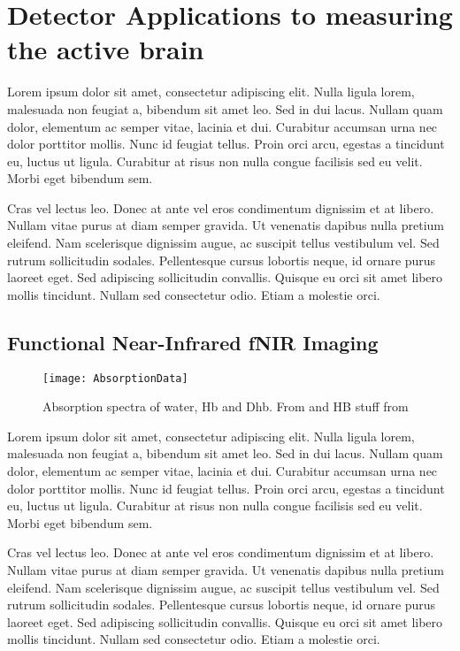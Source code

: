 \chapter{Detector Applications to measuring the active brain}
Lorem ipsum dolor sit amet, consectetur adipiscing elit. Nulla ligula lorem, malesuada non feugiat a, bibendum sit amet leo. Sed in dui lacus. Nullam quam dolor, elementum ac semper vitae, lacinia et dui. Curabitur accumsan urna nec dolor porttitor mollis. Nunc id feugiat tellus. Proin orci arcu, egestas a tincidunt eu, luctus ut ligula. Curabitur at risus non nulla congue facilisis sed eu velit. Morbi eget bibendum sem.

Cras vel lectus leo. Donec at ante vel eros condimentum dignissim et at libero. Nullam vitae purus at diam semper gravida. Ut venenatis dapibus nulla pretium eleifend. Nam scelerisque dignissim augue, ac suscipit tellus vestibulum vel. Sed rutrum sollicitudin sodales. Pellentesque cursus lobortis neque, id ornare purus laoreet eget. Sed adipiscing sollicitudin convallis. Quisque eu orci sit amet libero mollis tincidunt. Nullam sed consectetur odio. Etiam a molestie orci.

\section{{F}unctional {N}ear-{I}nfrared {fNIR} Imaging}
\begin{figure}[b]
  \begin{center}
    \texttt{[image: AbsorptionData]}
    \caption[Absorption spectra of water, deoxyhemoglobin and oxyhemoblogin]{\label{fig:fnirabsorption} Absorption spectra of water, Hb and Dhb.  From \citet{cope} and HB stuff from \citet{horecker} }
  \end{center}
\end{figure}

Lorem ipsum dolor sit amet, consectetur adipiscing elit. Nulla ligula lorem, malesuada non feugiat a, bibendum sit amet leo. Sed in dui lacus. Nullam quam dolor, elementum ac semper vitae, lacinia et dui. Curabitur accumsan urna nec dolor porttitor mollis. Nunc id feugiat tellus. Proin orci arcu, egestas a tincidunt eu, luctus ut ligula. Curabitur at risus non nulla congue facilisis sed eu velit. Morbi eget bibendum sem.

Cras vel lectus leo. Donec at ante vel eros condimentum dignissim et at libero. Nullam vitae purus at diam semper gravida. Ut venenatis dapibus nulla pretium eleifend. Nam scelerisque dignissim augue, ac suscipit tellus vestibulum vel. Sed rutrum sollicitudin sodales. Pellentesque cursus lobortis neque, id ornare purus laoreet eget. Sed adipiscing sollicitudin convallis. Quisque eu orci sit amet libero mollis tincidunt. Nullam sed consectetur odio. Etiam a molestie orci.

